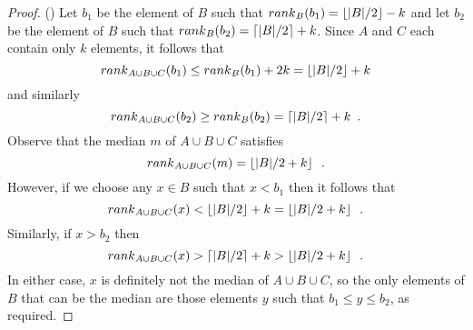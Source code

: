 \documentclass{njcarticle}
\newcommand{\rank}{\mathord{rank}}
\begin{document}
\begin{proof}()
Let $b_1$ be the element of $B$ such that
$\rank_B(b_1)=\floor{|B|/2}-k$ and let $b_2$ be the element of $B$ such that
$\rank_B(b_2)=\ceil{|B|/2}+k$.  Since $A$ and $C$ each contain only $k$
elements, it follows that
\[
\rank_{A\cup B\cup C}(b_1)\le \rank_B(b_1)+2k = \floor{|B|/2}+k
\]
and similarly
\[
\rank_{A\cup B\cup C}(b_2)\ge \rank_B(b_2) = \ceil{|B|/2}+k \enspace .
\]
Observe that the median $m$ of $A\cup B\cup C$ satisfies 
\[  
    \rank_{A\cup B\cup C}(m) = \floor{|B|/2+k} \enspace .
\]
However, if we choose any $x\in B$ such that $x < b_1$ then it follows that
\[
  \rank_{A\cup B\cup C}(x) < \floor{|B|/2} + k = \floor{|B|/2+k} \enspace .
\]
Similarly, if $x>b_2$ then
\[
  \rank_{A\cup B\cup C}(x) > \ceil{|B|/2} + k > \floor{|B|/2+k} \enspace .
\]
In either case, $x$ is definitely not the median of $A\cup B\cup C$,
so the only elements of $B$ that can be the median are those elements
$y$ such that $b_1\le y\le b_2$, as required.
\end{proof}



\end{document}
